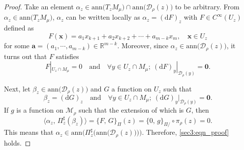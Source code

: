 \documentclass[10pt,a4paper]{amsart}
\begin{document}
\begin{proof}
Take an element $\alpha_z\in \mathrm{ann}\bigl(T_zM_{\mu}\bigr) \cap \mathrm{ann}\bigl(\mathcal{D}_{\rho}(z)\bigr)$ to be arbitrary. 
From $\alpha_z\in \mathrm{ann}\bigl(T_zM_{\mu}\bigr)$, 
$\alpha_z$ can be written locally as $\alpha_z = (\mathrm{d}F)_z$  %
with $F\in C^{\infty}(U_z)$ defined as 
\[
F(\boldsymbol{x})=a_1x_{k+1} + a_2x_{k+2}+\cdots +a_{m-k}x_{m},\quad \boldsymbol{x}\in U_z
\]
for some $\boldsymbol{a}=(a_1,\cdots,a_{m-k})\in \mathbb{R}^{m-k}$. Moreover, since $\alpha_z\in \mathrm{ann}\bigl(\mathcal{D}_{\rho}(z)\bigr)$, it turns out that $F$ satisfies 
\begin{equation}\label{sec3:eqn_proof2}
 F|_{U_z\cap M_{\mu}} = 0\quad \text{and}\quad \forall y\in U_z\cap M_{\mu};\ (\mathrm{d}F)_y|_{\mathcal{D}_{\rho}(y)} = \boldsymbol{0}. 
\end{equation}

Next, let $\beta_z\in \mathrm{ann}\bigl(\mathcal{D}_{\rho}(z)\bigr)$ and $G$ a function on $U_z$ such that 
\[
\beta_z=(\mathrm{d}G)_z\quad \text{and}\quad \forall y\in U_z\cap M_{\mu};\ 
(\mathrm{d}G)_y|_{\mathcal{D}_{\rho}(y)} = \boldsymbol{0}. 
\]
If $g$ is a function on $\mathcal{M}_{\rho}$ such that the extension of which is $G$, then 
\[
 \langle \alpha_z,\,\Pi^{\sharp}_z(\beta_z)\rangle = \{F,\,G\}_{\Pi}(z)=\{0,\,g\}_{\Pi/}\circ \pi_{\rho}(z)=0. 
\]
This means that $\alpha_z\in \mathrm{ann}\bigl(\Pi_z^{\sharp}\bigl(\mathrm{ann}\bigl(\mathcal{D}_{\rho}(z)\bigr)\bigr)\bigr)$. Therefore, \eqref{sec3:eqn_proof} holds. 
\end{proof}
\end{document}
